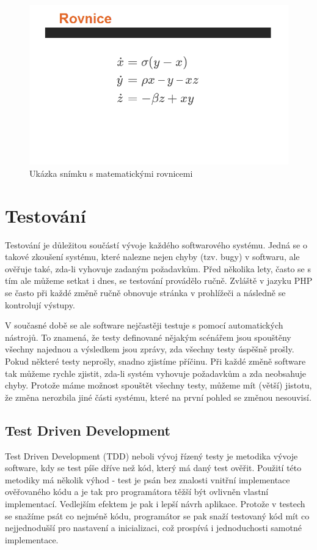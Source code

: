 \documentclass[11pt,twoside,a4paper]{book}
\newcommand*{\nomExpl}[2]{#2 (#1)\nomenclature{#1}{#2}} 	%
\begin{document}
\begin{figure}[ht]
	\begin{center}
		\includegraphics[width=14cm]{PRO-img/rovnice.png}
		\caption{Ukázka snímku s matematickými rovnicemi}
		\label{fig:rovnice}
	\end{center}
\end{figure}



\chapter{Testování}
Testování je důležitou součástí vývoje každého softwarového systému. Jedná se o takové zkoušení systému, které nalezne nejen chyby (tzv. bugy) v softwaru, ale ověřuje také, zda-li vyhovuje zadaným požadavkům. Před několika lety, často se s tím ale můžeme setkat i dnes, se testování provádělo ručně. Zvláště v jazyku PHP se často při každé změně ručně obnovuje stránka v prohlížeči a následně se kontrolují výstupy.

V současné době se ale software nejčastěji testuje s pomocí automatických nástrojů. To znamená, že testy definované nějakým scénářem jsou spouštěny všechny najednou a výsledkem jsou zprávy, zda všechny testy úspěšně prošly. Pokud některé testy neprošly, snadno zjistíme příčinu. Při každé změně software tak můžeme rychle zjistit, zda-li systém vyhovuje požadavkům a zda neobsahuje chyby. Protože máme možnost spouštět všechny testy, můžeme mít (větší) jistotu, že změna nerozbila jiné části systému, které na první pohled se změnou nesouvisí.


\section{Test Driven Development}
\nomExpl{TDD}{Test Driven Development} neboli vývoj řízený testy je metodika vývoje software, kdy se test píše dříve než kód, který má daný test ověřit. Použití této metodiky má několik výhod - test je psán bez znalosti vnitřní implementace ověřovaného kódu a je tak pro programátora těžší být ovlivněn vlastní implementací. Vedlejším efektem je pak i lepší návrh aplikace. Protože v testech se snažíme psát co nejméně kódu, programátor se pak snaží testovaný kód mít co nejjednodušší pro nastavení a inicializaci, což prospívá i jednoduchosti samotné implementace.
\end{document}
